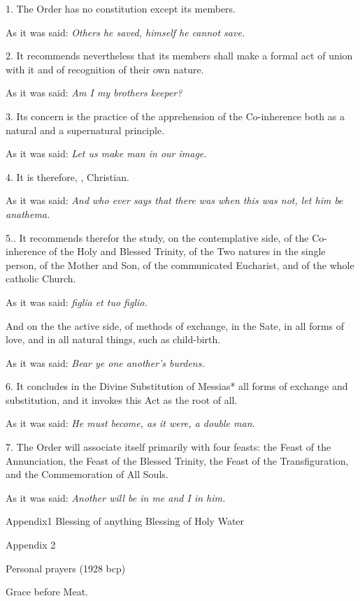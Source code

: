1. The Order has no constitution except its members.

As it was said: \emph{Others he saved, himself he cannot save.}

2. It recommends nevertheless that its members shall make a formal act of union with it and of recognition of their own nature.

As it was said: \emph{Am I my brothers keeper?}

3. Its concern is the practice of the apprehension of the Co-inherence both as a natural and a supernatural principle.

As it was said: \emph{Let us make man in our image.}

4. It is therefore, , Christian.

As it was said: \emph{And who ever says that there was when this was not, let him be anathema.}

5.. It recommends therefor the study, on the contemplative side, of the Co-inherence of the Holy and Blessed Trinity, of the Two natures in the single person, of the Mother and Son, of the communicated Eucharist, and of the whole catholic Church.

As it was said: \emph{figlia et tuo figlio.}

And on the the active side, of methods of exchange, in the Sate, in all forms of love, and in all natural things, such as child-birth.

As it was said: \emph{Bear ye one another's burdens.}

6. It concludes in the Divine Substitution of Messias* all forms of exchange and substitution, and it invokes this Act as the root of all.

As it was said: \emph{He must become, as it were, a double man.}

7. The Order will associate itself primarily with four feasts: the Feast of the Annunciation, the Feast of the Blessed Trinity, the Feast of the Transfiguration, and the Commemoration of All Souls.

As it was said: \emph{Another will be in me and I in him.}





Appendix1
Blessing of anything
Blessing of Holy Water

Appendix 2

Personal prayers (1928 bcp)


Grace before Meat.


